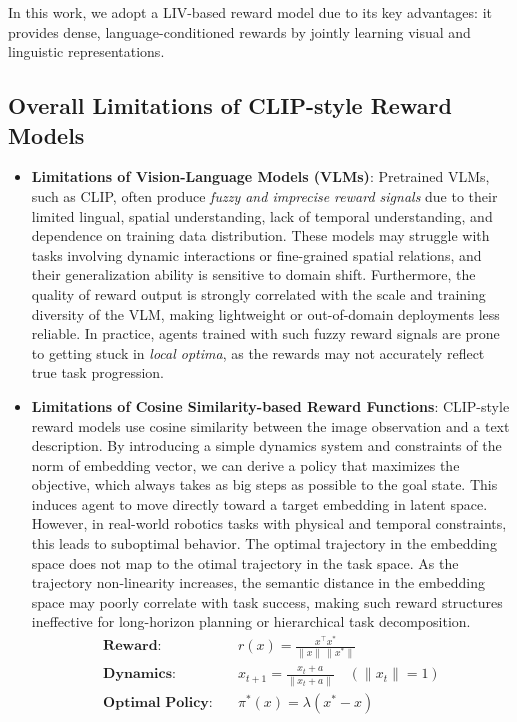 \documentclass[11pt]{article}
\begin{document}
In this work, we adopt a LIV-based reward model due to its key advantages: it provides dense, language-conditioned rewards by jointly learning visual and linguistic representations.

\subsection{Overall Limitations of CLIP-style Reward Models}
\begin{itemize}
    \item \textbf{Limitations of Vision-Language Models (VLMs)}: Pretrained VLMs, such as CLIP, often produce \emph{fuzzy and imprecise reward signals} due to their limited lingual, spatial understanding, lack of temporal understanding, and dependence on training data distribution. These models may struggle with tasks involving dynamic interactions or fine-grained spatial relations, and their generalization ability is sensitive to domain shift. Furthermore, the quality of reward output is strongly correlated with the scale and training diversity of the VLM, making lightweight or out-of-domain deployments less reliable. In practice, agents trained with such fuzzy reward signals are prone to getting stuck in \emph{local optima}, as the rewards may not accurately reflect true task progression.
    
    \item \textbf{Limitations of Cosine Similarity-based Reward Functions}: CLIP-style reward models use cosine similarity between the image observation and a text description. By introducing a simple dynamics system and constraints of the norm of embedding vector, we can derive a policy that maximizes the objective, which always takes as big steps as possible to the goal state.
This induces agent to move directly toward a target embedding in latent space. However, in real-world robotics tasks with physical and temporal constraints, this leads to suboptimal behavior. The optimal trajectory in the embedding space does not map to the otimal trajectory in the task space. As the trajectory non-linearity increases, the semantic distance in the embedding space may poorly correlate with task success, making such reward structures ineffective for long-horizon planning or hierarchical task decomposition.
\[
\begin{aligned}
\textbf{Reward:} \quad & r(x) = \frac{x^\top x^*}{\|x\| \, \|x^*\|} \quad \\
\textbf{Dynamics:} \quad & x_{t+1} = \frac{x_t + a}{\|x_t + a\|} \quad \left( \|x_t\| = 1 \right) \\[1.5ex]
\textbf{Optimal Policy:} \quad & \pi^*(x) = \lambda(x^* - x)
\end{aligned}
\]
\end{itemize}
\end{document}
